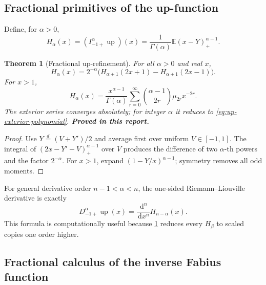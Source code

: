 \documentclass[11pt,oneside]{article}
\numberwithin{equation}{section}
\newtheorem{theorem}{Theorem}[section]
\theoremstyle{definition}
\theoremstyle{remark}
\newcommand{\Up}{\operatorname{up}}
\newcommand{\dd}{\,\mathrm d}
\newcommand{\E}{\mathbb E}
\newcommand{\statusproved}{\textcolor{proofgreen}{\textbf{Proved in this report.}}}
\begin{document}
\subsection{Fractional primitives of the up-function}

Define, for \(\alpha>0\),
\begin{equation}
 H_\alpha(x)=(I_{-1+}^{\alpha}\Up)(x)
 =\frac1{\Gamma(\alpha)}\E(x-Y)_+^{\alpha-1}.
 \label{eq:Halpha}
\end{equation}

\begin{theorem}[Fractional up-refinement]
\label{thm:up-fractional-refinement}
For all \(\alpha>0\) and real \(x\),
\begin{equation}
 \boxed{
 H_\alpha(x)=2^{-\alpha}
 \bigl(H_{\alpha+1}(2x+1)-H_{\alpha+1}(2x-1)\bigr).}
 \label{eq:up-fractional-refinement}
\end{equation}
For \(x>1\),
\begin{equation}
 \boxed{
 H_\alpha(x)=\frac{x^{\alpha-1}}{\Gamma(\alpha)}
 \sum_{r=0}^{\infty}
 \binom{\alpha-1}{2r}\mu_{2r}x^{-2r}.}
 \label{eq:Halpha-exterior}
\end{equation}
The exterior series converges absolutely; for integer \(\alpha\) it reduces to
\eqref{eq:up-exterior-polynomial}.  \statusproved
\end{theorem}

\begin{proof}
Use \(Y\stackrel d=(V+Y')/2\) and average first over uniform
\(V\in[-1,1]\).  The integral of \((2x-Y'-V)_+^{\alpha-1}\) over \(V\)
produces the difference of two \(\alpha\)-th powers and the factor
\(2^{-\alpha}\).  For \(x>1\), expand
\((1-Y/x)^{\alpha-1}\); symmetry removes all odd moments.
\end{proof}

For general derivative order \(n-1<\alpha<n\), the one-sided
Riemann--Liouville derivative is exactly
\begin{equation}
 D_{-1+}^{\alpha}\Up(x)
 =\frac{\dd^n}{\dd x^n}H_{n-\alpha}(x).
 \label{eq:up-RL-derivative-H}
\end{equation}
This formula is computationally useful because \cref{thm:up-fractional-refinement}
reduces every \(H_\beta\) to scaled copies one order higher.

\subsection{Fractional calculus of the inverse Fabius function}
\end{document}
